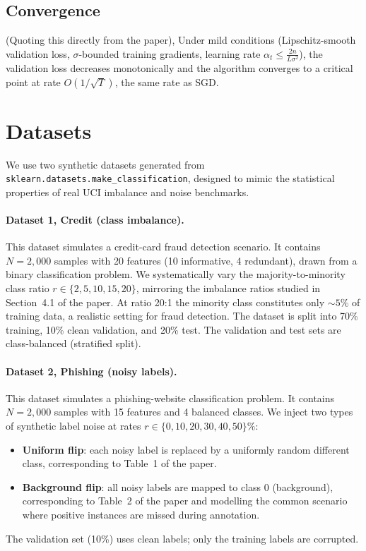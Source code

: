 \documentclass{article}
\begin{document}
\subsection{Convergence}

(Quoting this directly from the paper), Under mild conditions (Lipschitz-smooth validation loss, $\sigma$-bounded
training gradients, learning rate $\alpha_t \leq \frac{2n}{L\sigma^2}$),
the validation loss decreases monotonically and the algorithm converges to
a critical point at rate $O(1/\sqrt{T})$, the same rate as SGD.

\section{Datasets}

We use two synthetic datasets generated from \texttt{sklearn.datasets.make\_classification},
designed to mimic the statistical properties of real UCI imbalance and noise benchmarks.

\paragraph{Dataset 1, Credit (class imbalance).}
This dataset simulates a credit-card fraud detection scenario.
It contains $N=2{,}000$ samples with 20 features (10 informative, 4 redundant),
drawn from a binary classification problem.
We systematically vary the majority-to-minority class ratio
$r \in \{2, 5, 10, 15, 20\}$, mirroring the imbalance ratios studied in
Section~4.1 of the paper.
At ratio 20:1 the minority class constitutes only $\sim\!5\%$ of training data,
a realistic setting for fraud detection.
The dataset is split into 70\% training, 10\% clean validation, and 20\% test.
The validation and test sets are class-balanced (stratified split).

\paragraph{Dataset 2, Phishing (noisy labels).}
This dataset simulates a phishing-website classification problem.
It contains $N=2{,}000$ samples with 15 features and 4 balanced classes.
We inject two types of synthetic label noise at rates
$r \in \{0, 10, 20, 30, 40, 50\}\%$:
\begin{itemize}
  \item \textbf{Uniform flip}: each noisy label is replaced by a uniformly
    random different class, corresponding to Table~1 of the paper.
  \item \textbf{Background flip}: all noisy labels are mapped to class 0
    (background), corresponding to Table~2 of the paper and modelling the
    common scenario where positive instances are missed during annotation.
\end{itemize}
The validation set (10\%) uses clean labels; only the training labels are corrupted.
\end{document}
